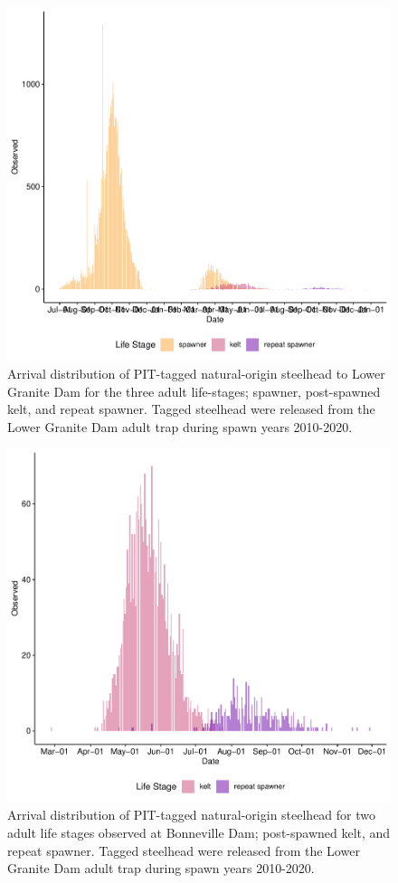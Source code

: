 \documentclass[11pt,a4paper,]{article}
\begin{document}
\begin{figure}
\centering
\includegraphics{Kelt_Summary_files/figure-latex/kelt-arrival-grs-1.pdf}
\caption{\label{fig:kelt-arrival-grs}Arrival distribution of PIT-tagged natural-origin steelhead to Lower Granite Dam for the three adult life-stages; spawner, post-spawned kelt, and repeat spawner. Tagged steelhead were released from the Lower Granite Dam adult trap during spawn years 2010-2020.}
\end{figure}

\begin{figure}
\centering
\includegraphics{Kelt_Summary_files/figure-latex/kelt-arrival-bon-1.pdf}
\caption{\label{fig:kelt-arrival-bon}Arrival distribution of PIT-tagged natural-origin steelhead for two adult life stages observed at Bonneville Dam; post-spawned kelt, and repeat spawner. Tagged steelhead were released from the Lower Granite Dam adult trap during spawn years 2010-2020.}
\end{figure}
\end{document}
